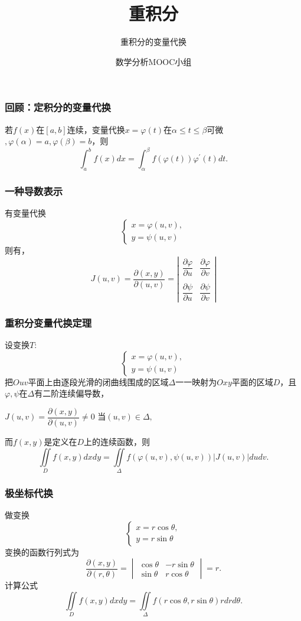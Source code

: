 \documentclass[xetex]{beamer}
\title{重积分}
\subtitle{重积分的变量代换}
\author{数学分析MOOC小组 }
\begin{document}
\frame{\maketitle}

\begin{frame}
    \frametitle{回顾：定积分的变量代换}
    若$f(x)$在$[a,b]$连续，变量代换$x=\varphi(t)$在$\alpha\leq t \leq\beta$可微$,\varphi(\alpha)=a,\varphi(\beta)=b$，则
    $$\int_a^bf(x)dx=\int_{\alpha}^{\beta}f(\varphi(t))\varphi^{'}(t)dt.$$
\end{frame}

\begin{frame}
    \frametitle{一种导数表示}
    有变量代换
    $$\begin{cases}
        x=\varphi(u,v),\\
        y=\psi(u,v)
    \end{cases}$$
    则有，
    $$J(u,v)=\dfrac{\partial(x,y)}{\partial(u,v)}=\left|
        \begin{matrix}
             \dfrac{\partial\varphi}{\partial u} & \dfrac{\partial \varphi}{\partial v} \\\\
             \dfrac{\partial\psi}{\partial u} & \dfrac{\partial \psi}{\partial v}
         \end{matrix}
         \right|$$
\end{frame}

\begin{frame}
    \frametitle{重积分变量代换定理}
    设变换$T:$
    $$\begin{cases}
        x=\varphi(u,v),\\
        y=\psi(u,v)
    \end{cases}$$
    把$Ouv$平面上由逐段光滑的闭曲线围成的区域$\Delta$一一映射为$Oxy$平面的区域$D$，且$\varphi,\psi$在$\Delta$有二阶连续偏导数，
    \begin{center}
    $J(u,v)=\dfrac{\partial(x,y)}{\partial(u,v)}\neq0$ \quad 当$(u,v)\in\Delta,$
    \end{center}
    而$f(x,y)$是定义在$D$上的连续函数，则
    $$\iint\limits_Df(x,y)dxdy=\iint\limits_{\Delta}f(\varphi(u,v),\psi(u,v)) | J(u,v)|dudv.$$
\end{frame}

\begin{frame}
    \frametitle{极坐标代换}
    做变换
    $$\begin{cases}
        x=r\cos{\theta},\\
        y=r\sin{\theta}
    \end{cases}$$
    变换的函数行列式为
    $$\dfrac{\partial(x,y)}{\partial(r,\theta)}=
    \begin{vmatrix}
        \cos{\theta} & -r\sin{\theta} \\
        \sin{\theta} & r\cos{\theta}
    \end{vmatrix}
    =r.$$
    计算公式
    $$\iint\limits_Df(x,y)dxdy=\iint\limits_{\Delta}f(r\cos{\theta},r\sin{\theta})rdrd\theta.$$
\end{frame}
\end{document}
